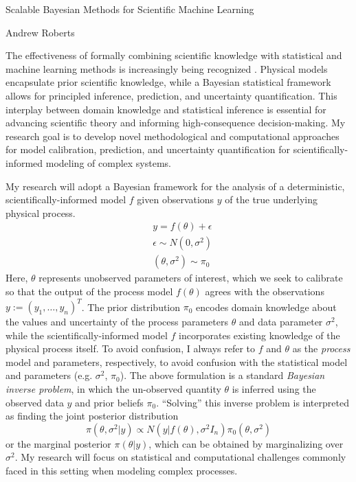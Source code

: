 \documentclass[12pt]{article}
\begin{document}
\begin{center}
Scalable Bayesian Methods for Scientific Machine Learning
\end{center}

\begin{flushright}
Andrew Roberts
\end{flushright} 

The effectiveness of formally combining scientific knowledge with statistical and machine learning methods is increasingly being recognized \cite{Willcox}. Physical models
encapsulate prior scientific knowledge, while a Bayesian statistical framework allows for principled inference, prediction, and uncertainty quantification. This interplay between domain 
knowledge and statistical inference is essential for advancing scientific theory and informing high-consequence decision-making. My research goal is to develop novel methodological 
and computational approaches for model calibration, prediction, and uncertainty quantification for scientifically-informed modeling of complex systems. 

My research will adopt a Bayesian framework for the analysis of a deterministic, scientifically-informed model $f$ given observations $y$ of the true underlying physical process.
\begin{align*}
&y = f(\theta) + \epsilon \\
&\epsilon \sim N(0, \sigma^2) \\
&(\theta, \sigma^2) \sim \pi_0
\end{align*}
Here, $\theta$ represents unobserved parameters of interest, which we seek to calibrate so that the output of the process model $f(\theta)$ agrees with the observations 
$y := (y_1, \dots, y_n)^T$. 
The prior distribution $\pi_0$ encodes domain knowledge about the values and uncertainty of the process parameters $\theta$ and data parameter $\sigma^2$, 
while the scientifically-informed model $f$ incorporates existing knowledge of the physical process itself. To avoid confusion, I always refer to $f$ and $\theta$ as the 
\textit{process} model and parameters, respectively, to avoid confusion with the statistical model and parameters (e.g. $\sigma^2$, $\pi_0$). 
The above formulation is a standard \textit{Bayesian inverse problem}, in which the un-observed quantity $\theta$ is inferred using the observed data $y$ and prior 
beliefs $\pi_0$. ``Solving'' this inverse problem is interpreted as finding the joint posterior distribution
\[\pi(\theta, \sigma^2|y) \propto N(y|f(\theta), \sigma^2 I_n)\pi_0(\theta, \sigma^2)\]
or the marginal posterior $\pi(\theta|y)$, which can be obtained by marginalizing over $\sigma^2$. My research will focus on statistical and computational challenges 
commonly faced in this setting when modeling complex processes.
\end{document}
